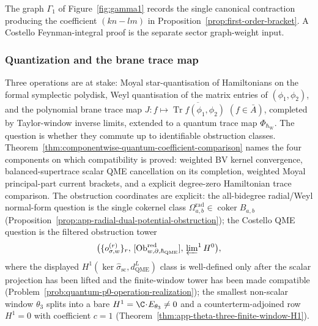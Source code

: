 \documentclass[11pt]{memoir}
\begin{document}
The graph $\Gamma_1$ of Figure~\ref{fig:gamma1} records the single canonical
contraction producing the coefficient $(kn-lm)$ in
Proposition~\ref{prop:first-order-bracket}. A Costello Feynman-integral
proof is the separate sector graph-weight input.

\subsubsection{Quantization and the brane trace map}\label{sssec:quantization-trace-map}

Three operations are at stake: Moyal star-quantisation of
Hamiltonians on the formal symplectic polydisk, Weyl quantisation of
the matrix entries of \((\phi_1,\phi_2)\), and the polynomial brane
trace map
\(J\colon f\mapsto\overline{\operatorname{Tr}f(\phi_1,\phi_2)}\)
\((f\in\bar A)\), completed by Taylor-window inverse limits,
extended to a quantum trace map \(\Phi_{\hbar_{\mathrm{W}}}\).  The question is
whether they commute up to identifiable obstruction classes.
Theorem~\ref{thm:componentwise-quantum-coefficient-comparison} names
the four components on which compatibility is proved: weighted BV
kernel convergence, balanced-supertrace scalar QME cancellation on
its completion, weighted Moyal principal-part current brackets, and a
explicit degree-zero Hamiltonian trace comparison.  The
obstruction coordinates are explicit: the all-bidegree
radial/Weyl normal-form question is the single cokernel class
\(\Omega^{\mathrm{rad}}_{a,b}\in\operatorname{coker}B_{a,b}\)
(Proposition~\ref{prop:app-radial-dual-potential-obstruction}); the
Costello QME question is the filtered obstruction tower
\[
  \bigl(\{o_{\sigma,w}^{(r)}\}_r,\,
  [\operatorname{Ob}^{\mathrm{red}}_{w,\partial,\hbar_{\mathrm{QME}}}],\,
  \varprojlim\nolimits^1 H^0\bigr),
\]
where the displayed \(H^1(\ker\widehat\sigma_{\mathrm{sc}},
d_{\mathrm{QME}}^{L})\) class is well-defined only after the scalar
projection has been lifted and the finite-window tower has been made
compatible
(Problem~\ref{prob:quantum-p0-operation-realization}); the smallest
non-scalar window \(\theta_3\) splits into a bare
\(H^1=\C\!\cdot\!E_{\theta_3}\ne0\) and a counterterm-adjoined row
\(H^1=0\) with coefficient \(c=1\)
(Theorem~\ref{thm:app-theta-three-finite-window-H1}).
\end{document}
